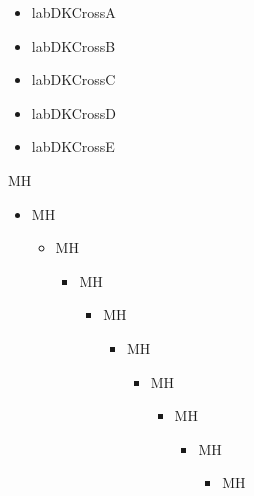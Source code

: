 \documentclass[a4paper]{article}%
\begin{document}
\begin{itemize}[labDKCrossA]
\item%
    labDKCrossA
\end{itemize}
\begin{itemize}[labDKCrossB]
\item%
    labDKCrossB
\end{itemize}
\begin{itemize}[labDKCrossC]
\item%
    labDKCrossC
\end{itemize}
\begin{itemize}[labDKCrossD]
\item%
    labDKCrossD
\end{itemize}
\begin{itemize}[labDKCrossE]
\item%
    labDKCrossE
\end{itemize}
MH





\clearpage
\begin{itemize}
    \item MH
\begin{itemize}
    \item MH
\begin{itemize}
    \item MH
\begin{itemize}
    \item MH
\begin{itemize}
    \item MH
\begin{itemize}
    \item MH
\begin{itemize}
    \item MH
\begin{itemize}
    \item MH
\begin{itemize}
    \item MH
\end{itemize}
\end{itemize}
\end{itemize}
\end{itemize}
\end{itemize}
\end{itemize}
\end{itemize}
\end{itemize}
\end{itemize}
\end{document}
